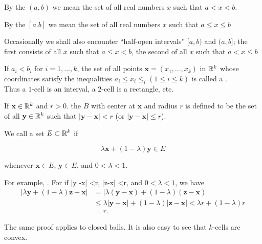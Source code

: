 \begin{mydef}
    \label{mydef:2.17}
By the  $(a, b)$ we mean the set of all real numbers $x$
such that $a < x <b$.

By the  $[a. b]$ we mean the set of all real numbers $x$ such that $a \leq x \leq b$

Occasionally we shall also encounter ``half-open intervals'' $[a, b)$ and $(a, b]$; the first consists of all $x$ such that $a \leq x < b$, the second of all $x$ such that $a < x \leq b$
\end{mydef}

If $a_i <b_i$ for $i=1,...,k$, the set of all points $\mathbf{x} =(x_1, ..., x_k)$ in ${\protect\mathbb R}^k$ whose coordinates satisfy the inequalities $a_i \leq x_i \leq _i (1 \leq i \leq k)$ is called a .\\
Thus a $1$-cell is an interval, a $2$-cell is a rectangle, etc.

If $\mathbf{x}\in {\protect\mathbb R}^k$ and $r > 0$. the  $B$ with center at $\mathbf{x}$ and radius $r$ is defined to be the set of all $\mathbf{y} \in {\protect\mathbb R}^k$ such that $|\mathbf{y} - \mathbf{x}| <r$ (or $|\mathbf{y} - \mathbf{x}| \leq r$).

We call a set $E \subset {\protect\mathbb R}^k$  if

\begin{equation*}
    \lambda\mathbf{x} + (1 - \lambda)\mathbf{y} \in E
\end{equation*}

whenever $\mathbf{x} \in E$, $\mathbf{y} \in E$, and $0 < \lambda < 1$.

For example, . For if |y -x| <r, |z-x| <r, and
$0 < \lambda <1$, we have
\begin{align*}
    |\lambda \mathbf{y} + (1-\lambda) \mathbf{z} - \mathbf{x}|
    & = |\lambda (\mathbf{y} - \mathbf{x}) + (1 - \lambda)(\mathbf{z} - \mathbf{x})\\
    & \leq \lambda |\mathbf{y} - \mathbf{x}| + (1 - \lambda)|\mathbf{z} - \mathbf{x}| < \lambda r + (1 - \lambda)r\\
    & = r.
\end{align*}

The same proof applies to closed balls. It is also easy to see that $k$-cells are convex.


